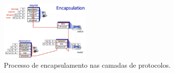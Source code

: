 \begin{itemize}[left=0.5cm, align=left, nosep]
        \begin{figure}[H]
            \centering
            \includegraphics[width=0.4\textwidth]{img/cap-01/encapsulamento.png}
            \caption{Processo de encapsulamento nas camadas de protocolos.}
        \end{figure}
    
    \end{itemize}
